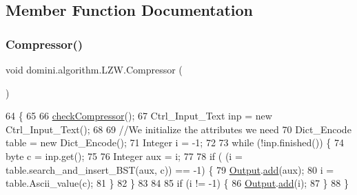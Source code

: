 \subsection{Member Function Documentation}
\mbox{\label{classdomini_1_1algorithm_1_1LZW_a04a13292c78f6d958270fec8bc6975be}} 
\subsubsection{\texorpdfstring{Compressor()}{Compressor()}}
{\footnotesize\ttfamily void domini.\+algorithm.\+L\+Z\+W.\+Compressor (\begin{DoxyParamCaption}{ }\end{DoxyParamCaption})\hspace{0.3cm}{\ttfamily [inline]}}


\begin{DoxyCode}
64                              \{
65 
66         \hyperlink{classdomini_1_1algorithm_1_1Algorithm_a070b7e7dcc453b03751d265beae5306c}{checkCompressor}();
67         Ctrl\_Input\_Text inp = \textcolor{keyword}{new} Ctrl\_Input\_Text();
68 
69         \textcolor{comment}{//We initialize the attributes we need}
70         Dict\_Encode table = \textcolor{keyword}{new} Dict\_Encode();
71         Integer i = -1;
72         
73         \textcolor{keywordflow}{while} (!inp.finished()) \{
74             byte c = inp.get();
75 
76             Integer aux = i;
77 
78             \textcolor{keywordflow}{if} ( (i = table.search\_and\_insert\_BST(aux, c)) == -1) \{
79                 \hyperlink{classdomini_1_1algorithm_1_1Algorithm_a4de9955411c656325adc391ef570c082}{Output}.\hyperlink{classpersistencia_1_1output_1_1Ctrl__Output_a8c5aa5a6acb5259faeb1c05c71ddd21c}{add}(aux);
80                 i = table.Ascii\_value(c);
81             \}
82         \}
83 
84         
85         \textcolor{keywordflow}{if} (i != -1) \{
86             \hyperlink{classdomini_1_1algorithm_1_1Algorithm_a4de9955411c656325adc391ef570c082}{Output}.\hyperlink{classpersistencia_1_1output_1_1Ctrl__Output_a8c5aa5a6acb5259faeb1c05c71ddd21c}{add}(i); 
87         \}
88     \}
\end{DoxyCode}
\mbox{\label{classdomini_1_1algorithm_1_1LZW_a6a5d986396443691861ac9ba41b2dd33}} 
